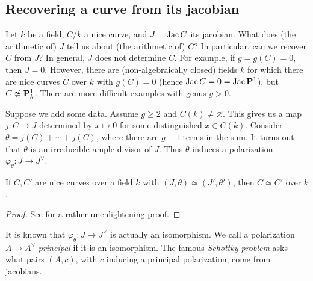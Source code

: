 \subsection{Recovering a curve from its jacobian}

Let $k$ be a field, $C/k$ a nice curve, and $J=\operatorname{Jac} C$ its jacobian. What does 
(the arithmetic of) $J$ tell us about (the arithmetic of) $C$? In particular, 
can we recover $C$ from $J$? In general, $J$ does not determine $C$. For 
example, if $g=g(C)=0$, then $J=0$. However, there are (non-algebraically 
closed) fields $k$ for which there are nice curves $C$ over $k$ with $g(C)=0$ 
(hence $\operatorname{Jac} C=0=\operatorname{Jac}\mathbf{P}^1$), but $C\not\simeq \mathbf{P}_k^1$. There are more 
difficult examples with genus $g>0$. 

Suppose we add some data. Assume $g\geqslant 2$ and $C(k)\ne\varnothing$. This 
gives us a map $j:C\to J$ determined by $x\mapsto 0$ for some distinguished 
$x\in C(k)$. Consider $\theta = j(C)+\cdots + j(C)$, where there are $g-1$ 
terms in the sum. It turns out that $\theta$ is an irreducible ample divisor of 
$J$. Thus $\theta$ induces a polarization $\varphi_\theta:J\to J^\vee$. 

\begin{theorem}[Torelli]
If $C,C'$ are nice curves over a field $k$ with $(J,\theta)\simeq (J',\theta')$, 
then $C\simeq C'$ over $k$. 
\end{theorem}
\begin{proof}
See \cite[III.13]{mi-av} for a rather unenlightening proof. 
\end{proof}

It is known that $\varphi_\theta:J\to J^\vee$ is actually an isomorphism. We 
call a polarization $A\to A^\vee$ \emph{principal} if it is an isomorphism. 
The famous \emph{Schottky problem} asks 
what pairs $(A,c)$, with $c$ inducing a principal polarization, come from 
jacobians. 

